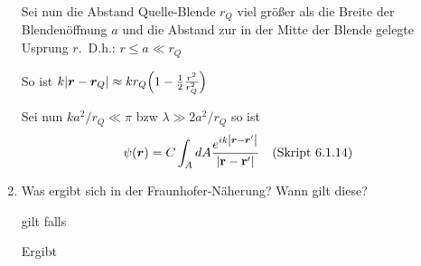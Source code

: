\begin{enumerate}
    Sei nun die Abstand Quelle-Blende $r_Q$ viel größer als die 
    Breite der Blendenöffnung $a$ und die Abstand zur in der Mitte 
    der Blende gelegte Usprung $r$.\ D.h.: 
    $r\le a \ll r_Q$

    So ist 
    $k\abs{\vb* r -\vb* r_Q}\approx kr_Q\qty(1-\frac{1}{2}\frac{r^2}{r^2_Q})$

    Sei nun $ka^2/r_Q\ll \pi$ bzw $\lambda \gg 2a^2/r_Q$ so ist
    \begin{equation*}
      \psi(\vb* r)=C\int_A dA \frac{e^{ik\abs{\vb* r-\vb* r'}}}{\abs{\vb{r}-\vb{r}'}}\quad\text{(Skript 6.1.14)}
    \end{equation*}
  \item Was ergibt sich in der Fraunhofer-Näherung? Wann gilt diese?

    gilt falls 

    Ergibt 

\end{enumerate}
